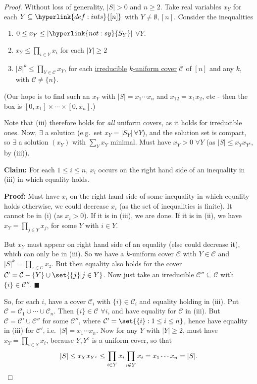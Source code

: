 \documentclass{article}
\let\subset\subseteq
\begin{document}
\begin{proof}
  Without loss of generality, $|S| > 0$ and $n \geq 2$.
  Take real variables $x_Y$ for each $Y \subseteq \hyperlink{def:ints}{[n]}$ with $Y \neq \emptyset, [n]$.
  Consider the inequalities
  \begin{enumerate}[label=(\roman*)]
    \item $ 0 \leq x_Y \leq |\hyperlink{not:sy}{S_Y}|$ $\forall Y$.
    \item $x_Y \leq \prod_{i \in Y} x_i$ for each $|Y| \geq 2$
    \item $|S|^k \leq \prod_{Y \in \mathcal{C}} x_Y$, for each \hyperlink{def:irred}{irreducible} \hyperlink{def:cover}{$k$-uniform cover} $\mathcal{C}$ of $[n]$ and any $k$, with $\mathcal{C} \neq \{n\}$.
  \end{enumerate}
  (Our hope is to find such an $x_Y$ with $|S| = x_1 \dotsm x_n$ and $x_{12} = x_1 x_2$, etc - then the box is $[0, x_1] \times \dotsm \times [0, x_n]$.)

  Note that (iii) therefore holds for \emph{all} uniform covers, as it holds for irreducible ones.
  Now, $\exists$ a solution (e.g.\ set $x_Y = |S_Y|\ \forall Y$), and the solution set is compact, so $\exists$ a solution $(x_Y)$ with $\sum_Y x_Y$ minimal.
  Must have $x_Y > 0$ $\forall Y$ (as $|S| \leq x_Y x_{Y^c}$, by (iii)).

  \textbf{Claim:} For each $1 \leq i \leq n$, $x_i$ occurs on the right hand side of an inequality in (iii) in which equality holds.

  \textbf{Proof:} Must have $x_i$ on the right hand side of some inequality in which equality holds otherwise, we could decrease $x_i$ (as the set of inequalities is finite).
  It cannot be in (i) (as $x_i > 0$).
  If it is in (iii), we are done. If it is in (ii), we have $x_Y = \prod_{j \in Y} x_j$, for some $Y$ with $i \in Y$.

  But $x_Y$ must appear on right hand side of an equality (else could decrease it), which can only be in (iii).
  So we have a $k$-uniform cover $\mathcal{C}$ with $Y \in \mathcal{C}$ and $|S|^k = \prod_{z \in \mathcal{C}} x_z$.
  But then equality also holds for the cover $\mathcal{C}' = \mathcal{C} - \{Y\} \cup \set{\{j\} | j \in Y}$.
  Now just take an irreducible $\mathcal{C}'' \subset \mathcal{C}$ with $\{i\} \in \mathcal{C}''$. $\blacksquare$

  So, for each $i$, have a cover $\mathcal{C}_i$ with $\{i\} \in \mathcal{C}_i$ and equality holding in (iii).
  Put $\mathcal{C} = \mathcal{C}_1 \cup \dotsb \cup \mathcal{C}_n$. Then $\{i\} \in \mathcal{C}$ $\forall i$, and have equality for $\mathcal{C}$ in (iii).
  But $\mathcal{C} = \mathcal{C}' \cup \mathcal{C}''$ for some $\mathcal{C}''$, where $\mathcal{C}' = \set{\{i\} : 1 \leq i \leq n}$, hence have equality in (iii) for $\mathcal{C}'$, i.e.\ $|S| = x_1 \dotsm x_n$.
  Now for any $Y$ with $|Y| \geq 2$, must have $x_Y = \prod_{i \in Y} x_i$, because $Y,Y^c$ is a uniform cover, so that
  \begin{equation*}|S| \leq x_Y x_{Y^c} \leq \prod_{i \in Y} x_i \prod_{i \notin Y} x_i = x_1 \dotsm x_n = |S|.\qedhere\end{equation*}
\end{proof}
\end{document}
